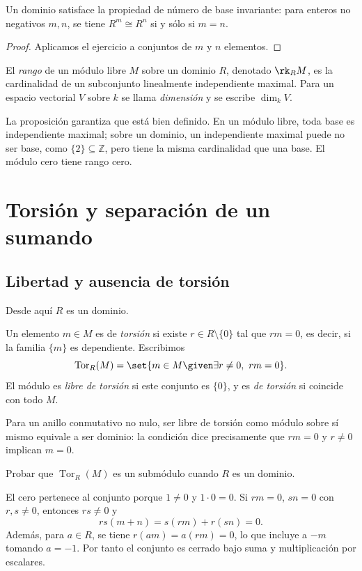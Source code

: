 \begin{coro}
Un dominio satisface la propiedad de número de base invariante: para enteros no negativos $m,n$, se tiene $R^m\cong R^n$ si y sólo si $m=n$.
\end{coro}
\begin{proof}
Aplicamos el ejercicio a conjuntos de $m$ y $n$ elementos.
\end{proof}

\begin{defi}
El \emph{rango} de un módulo libre $M$ sobre un dominio $R$, denotado $\rk_R M$, es la cardinalidad de un subconjunto linealmente independiente maximal. Para un espacio vectorial $V$ sobre $k$ se llama \emph{dimensión} y se escribe $\dim_k V$.
\end{defi}
La proposición garantiza que está bien definido. En un módulo libre, toda base es independiente maximal; sobre un dominio, un independiente maximal puede no ser base, como $\{2\}\subseteq\mathbb Z$, pero tiene la misma cardinalidad que una base. El módulo cero tiene rango cero.

\newpage
\section{Torsión y separación de un sumando}
\subsection{Libertad y ausencia de torsión}
Desde aquí $R$ es un dominio.
\begin{defi}
Un elemento $m\in M$ es de \emph{torsión} si existe $r\in R\setminus\{0\}$ tal que $rm=0$, es decir, si la familia $\{m\}$ es dependiente. Escribimos
\[
\operatorname{Tor}_R(M)=\set{m\in M\given \exists r\ne0,\ rm=0}.
\]
El módulo es \emph{libre de torsión} si este conjunto es $\{0\}$, y es \emph{de torsión} si coincide con todo $M$.
\end{defi}
Para un anillo conmutativo no nulo, ser libre de torsión como módulo sobre sí mismo equivale a ser dominio: la condición dice precisamente que $rm=0$ y $r\ne0$ implican $m=0$.

\begin{ejer}[Remisión a VI.4.1]\label{ejer:C20-torsion}
Probar que $\operatorname{Tor}_R(M)$ es un submódulo cuando $R$ es un dominio.
\end{ejer}
\begin{sol}
El cero pertenece al conjunto porque $1\ne0$ y $1\cdot0=0$. Si $rm=0$, $sn=0$ con $r,s\ne0$, entonces $rs\ne0$ y
\[
rs(m+n)=s(rm)+r(sn)=0.
\]
Además, para $a\in R$, se tiene $r(am)=a(rm)=0$, lo que incluye a $-m$ tomando $a=-1$. Por tanto el conjunto es cerrado bajo suma y multiplicación por escalares.
\end{sol}

